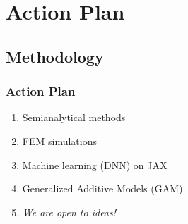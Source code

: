 \documentclass{beamer}
\begin{document}
    \section{Action Plan}
    \subsection{Methodology}
    \begin{frame}
        \frametitle{Action Plan}
        \begin{enumerate}
            \item<1-> Semianalytical methods
            \item<2-> FEM simulations
            \item<3-> Machine learning (DNN) on JAX
            \item<4-> Generalized Additive Models (GAM)
            \item<5-> \emph{We are open to ideas!}
        \end{enumerate}
    \end{frame}
\end{document}
